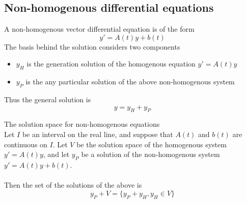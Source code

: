 \documentclass[journal, letterpaper]{IEEEtran}
\begin{document}
    \subsection{Non-homogenous differential equations}
    A non-homogenous vector differential equation is of the form
    $$ y' = A(t)y + b(t)$$
    The basis behind the solution considers two components
    \begin{itemize}
        \item $y_H$ is the generation solution of the homogenous equation $y' = A(t)y$
        \item $y_P$ is the any particular solution of the above non-homogenous system
    \end{itemize}
    Thus the general solution is
    $$ y = y_H + y_P$$
    \begin{mybox}{The solution space for non-homogenous equations} \\
        Let $I$ be an interval on the real line, and suppose that $A(t)$ and $b(t)$ are continuous on $I$. Let $V$ be the solution space of the homogenous system $y' = A(t)y$, and let $y_P$ be a solution of the non-homogenous system $y' = A(t)y + b(t)$.
        \\ \\ 
        Then the set of the solutions of the above is
        $$ y_P + V = \{y_P + y_H, y_H \in V \}$$
    \end{mybox}
\end{document}
